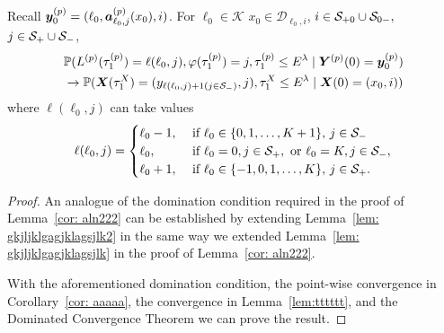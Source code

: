 \begin{cor}\label{cor: aln2222a} Recall \(\boldsymbol y_{0}^{(p)} = (\ell_0, \boldsymbol a_{\ell_0,j}^{(p)}(x_0), i)\). For \(\ell_0\in\mathcal K\) \(x_0\in\mathcal D_{\ell_0,i}\), \(i\in\mathcal S_{+0}\cup\mathcal{S}_{0-},\) \(j\in\mathcal{S}_+\cup\mathcal{S}_-\), 
	\begin{align}
		&\mathbb P(L^{(p)}(\tau_1^{(p)}) = \ell(\ell_0,j), \varphi(\tau_1^{(p)}) = j, \tau_{1}^{(p)}\leq E^\lambda 
            	 \mid \boldsymbol Y^{(p)}(0) = \boldsymbol y_0^{(p)}) \nonumber
		\\&\to \mathbb P(\boldsymbol X(\tau_1^X) = (y_{\ell(\ell_0,j)+1(j\in\mathcal{S}_-)}, j), \tau_{1}^X\leq E^\lambda 
            	 \mid \boldsymbol X(0) = (x_0,i))\label{eqn: 14212a}
	\end{align}
	where \(\ell(\ell_0,j)\) can take values
	\begin{align*}
		\ell(\ell_0,j) = \begin{cases}
			\ell_0-1, &\mbox{ if } \ell_0\in\{0,1,\dots,K+1\},\, j\in\mathcal{S}_-\\
			\ell_0, & \mbox{ if } \ell_0 = 0, j\in\mathcal S_+, \mbox{ or }\ell_0 = K, j\in\mathcal S_-,\\
			\ell_0+1, & \mbox{ if } \ell_0\in\{-1,0,1,\dots,K\},\, j\in\mathcal{S}_+.
		\end{cases}
	\end{align*}
\end{cor}
\begin{proof}
	An analogue of the domination condition required in the proof of Lemma~\ref{cor: aln222} can be established by extending Lemma~\ref{lem: gkjljklgagjklagsjlk2} in the same way we extended Lemma~\ref{lem: gkjljklgagjklagsjlk} in the proof of Lemma~\ref{cor: aln222}. 

	With the aforementioned domination condition, the point-wise convergence in Corollary~\ref{cor: aaaaa}, the convergence in Lemma~\ref{lem:tttttt}, and the Dominated Convergence Theorem we can prove the result. 
\end{proof}

